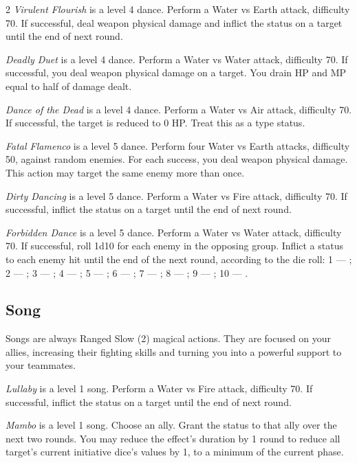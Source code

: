 \begin{multicols}{2}
    \textit{Virulent Flourish} is a level 4 dance. Perform a Water vs Earth attack, difficulty 70. If successful, deal weapon physical damage and inflict the  status on a target until the end of next round.
    
    \textit{Deadly Duet} is a level 4 dance. Perform a Water vs Water attack, difficulty 70. If successful, you deal weapon physical damage on a target. You drain HP and MP equal to half of damage dealt.
    
    \textit{Dance of the Dead} is a level 4 dance. Perform a Water vs Air attack, difficulty 70. If successful, the target is reduced to 0 HP\@. Treat this as a  type status.
    
    \textit{Fatal Flamenco} is a level 5 dance. Perform four Water vs Earth attacks, difficulty 50, against random enemies. For each success, you deal weapon physical damage. This action may target the same enemy more than once.
    
    \textit{Dirty Dancing} is a level 5 dance. Perform a Water vs Fire attack, difficulty 70. If successful, inflict the  status on a target until the end of next round.
    
    \textit{Forbidden Dance} is a level 5 dance. Perform a Water vs Water attack, difficulty 70. If successful, roll 1d10 for each enemy in the opposing group. Inflict a status to each enemy hit until the end of the next round, according to the die roll: 1 --- ; 2 --- ; 3 --- ; 4 --- ; 5 --- ; 6 --- ; 7 --- ; 8 --- ; 9 --- ; 10 --- .
    

    \subsection{Song}\label{subsec:perf-song}

    Songs are always Ranged Slow (2) magical actions. They are focused on your allies, increasing their fighting skills and turning you into a powerful support to your teammates.
    
    \textit{Lullaby} is a level 1 song. Perform a Water vs Fire attack, difficulty 70. If successful, inflict the  status on a target until the end of next round.
    
    \textit{Mambo} is a level 1 song. Choose an ally. Grant the  status to that ally over the next two rounds. You may reduce the effect's duration by 1 round to reduce all target's current initiative dice's values by 1, to a minimum of the current phase.
    

\end{multicols}
